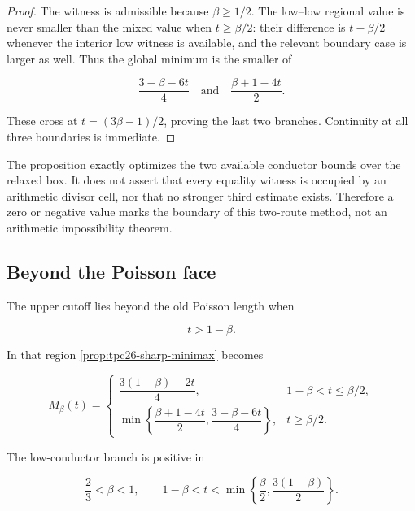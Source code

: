 \begin{proof}
The witness is admissible because \(\beta\ge1/2\).  The low--low
regional value is never smaller than the mixed value when
\(t\ge\beta/2\): their difference is \(t-\beta/2\) whenever the
interior low witness is available, and the relevant boundary case is
larger as well.  Thus the global minimum is the smaller of

\[
 \frac{3-\beta-6t}{4}
 \quad\text{and}\quad
 \frac{\beta+1-4t}{2}.
\]

These cross at \(t=(3\beta-1)/2\), proving the last two branches.
Continuity at all three boundaries is immediate.
\end{proof}

\begin{remark}
\label{rem:tpc26-sharp-scope}
The proposition exactly optimizes the two available conductor bounds
over the relaxed box.  It does not assert that every equality witness
is occupied by an arithmetic divisor cell, nor that no stronger third
estimate exists.  Therefore a zero or negative value marks the boundary
of this two-route method, not an arithmetic impossibility theorem.
\end{remark}

\subsection{Beyond the Poisson face}

The upper cutoff lies beyond the old Poisson length when

\begin{equation}
 t>1-\beta.
 \label{eq:tpc26-beyond-Poisson}
\end{equation}

In that region \cref{prop:tpc26-sharp-minimax} becomes

\begin{equation}
 M_\beta(t)=
 \begin{cases}
 \dfrac{3(1-\beta)-2t}{4},
 &1-\beta<t\le\beta/2,\\[6pt]
 \displaystyle\min\left\{
 \dfrac{\beta+1-4t}{2},
 \dfrac{3-\beta-6t}{4}\right\},
 &t\ge\beta/2.
 \end{cases}
 \label{eq:tpc26-beyond-ledger}
\end{equation}

The low-conductor branch is positive in

\begin{equation}
 \boxed{
 \frac23<\beta<1,
 \qquad
 1-\beta<t<
 \min\left\{\frac\beta2,
 \frac{3(1-\beta)}2\right\}.}
 \label{eq:tpc26-low-crossing-window}
\end{equation}

